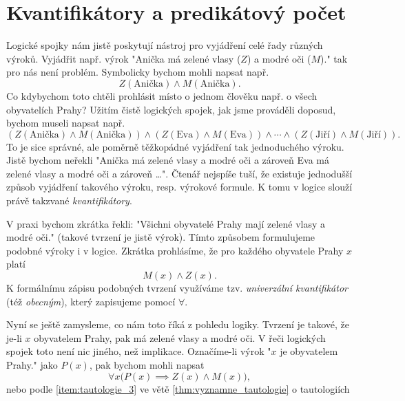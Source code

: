 \section{Kvantifikátory a predikátový počet}\label{sec:kvantifikatory_a_pred_pocet}

Logické spojky nám jistě poskytují nástroj pro vyjádření celé řady různých výroků. Vyjádřit např. výrok "Anička má zelené vlasy ($Z$) a modré oči ($M$)." tak pro nás není problém. Symbolicky bychom mohli napsat např.
\begin{equation*}
    Z({\text{Anička}}) \land M({\text{Anička}}).
\end{equation*}
Co kdybychom toto chtěli prohlásit místo o jednom člověku např. o všech obyvatelích Prahy? Užitím čistě logických spojek, jak jsme prováděli doposud, bychom museli napsat např.
\begin{equation*}
    (Z({\text{Anička}}) \land M({\text{Anička}})) \land (Z({\text{Eva}}) \land M({\text{Eva}})) \land \cdots \land (Z({\text{Jiří}}) \land M({\text{Jiří}})).
\end{equation*}
To je sice správné, ale poměrně těžkopádné vyjádření tak jednoduchého výroku. Jistě bychom neřekli "Anička má zelené vlasy a modré oči a zároveň Eva má zelené vlasy a modré oči a zároveň \dots". Čtenář nejspíše tuší, že existuje jednodušší způsob vyjádření takového výroku, resp. výrokové formule. K tomu v logice slouží právě takzvané \emph{kvantifikátory}.\par
V praxi bychom zkrátka řekli: "Všichni obyvatelé Prahy mají zelené vlasy a modré oči." (takové tvrzení je jistě výrok). Tímto způsobem formulujeme podobné výroky i v logice. Zkrátka prohlásíme, že pro každého obyvatele Prahy $x$ platí
\begin{equation*}
    M(x) \land Z(x).
\end{equation*}
K formálnímu zápisu podobných tvrzení využíváme tzv. \emph{univerzální kvantifikátor} (též \emph{obecným}), který zapisujeme pomocí $\forall$.\par
Nyní se ještě zamysleme, co nám toto říká z pohledu logiky. Tvrzení je takové, že je-li $x$ obyvatelem Prahy, pak má zelené vlasy a modré oči. V řeči logických spojek toto není nic jiného, než implikace. Označíme-li výrok "$x$ je obyvatelem Prahy." jako $P(x)$, pak bychom mohli napsat
\begin{equation}\label{eq:univ_kvatifikator_priklad}
    \forall x \bigl(P(x) \implies Z(x) \land M(x)\bigr),
\end{equation}
nebo podle \ref{item:tautologie_3} ve větě \ref{thm:vyznamne_tautologie} o tautologiích
